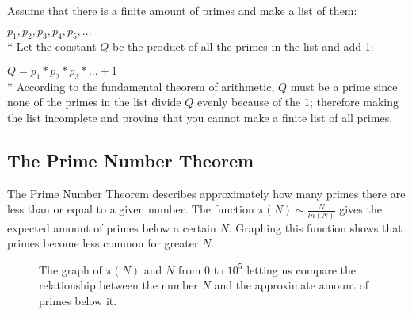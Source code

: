 \documentclass[main.tex]{subfiles}
\begin{document}
\begin{mdframed}
    Assume that there is a finite amount of primes and make a list of them:

    $p_1, p_2, p_3, p_4, p_5, ...$ 
    \newline
    \\*
    Let the constant $Q$ be the product of all the primes in the list and add 1:

    $Q = p_1 * p_2 * p_3 * ... + 1$
    \newline
    \\*
    According to the fundamental theorem of arithmetic, $Q$ must be a prime since none of the primes in the list divide $Q$ evenly because of the $1$; therefore making the list incomplete and proving that you cannot make a finite list of all primes. 
\end{mdframed}

\subsection{The Prime Number Theorem}
The Prime Number Theorem \cite{theorem:prime_num} describes approximately how many primes there are less than or equal to a given number. The function $\pi(N) \sim \frac{N}{ln(N)}$ gives the expected amount of primes below a certain $N$. Graphing this function shows that primes become less common for greater $N$.

\begin{figure}[h]
    \begin{center}
    \end{center}
\caption{The graph of $\pi(N)$ and $N$ from $0$ to $10^{5}$ letting us compare the relationship between the number $N$ and the approximate amount of primes below it.}
\end{figure}
\end{document}
